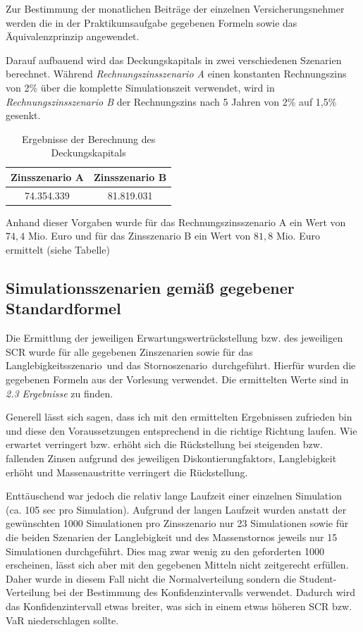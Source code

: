 \documentclass[parskip,12pt,paper=a4]{scrartcl}
\begin{document}
Zur Bestimmung der monatlichen Beiträge der einzelnen Versicherungsnehmer werden die in der Praktikumsaufgabe
gegebenen Formeln sowie das Äquivalenzprinzip angewendet.

Darauf aufbauend wird das Deckungskapitals in zwei verschiedenen Szenarien berechnet. Während {\itshape Rechnungszinsszenario A} einen konstanten Rechnungszins von 2\% über die komplette Simulationszeit verwendet, wird in {\itshape Rechnungszinsszenario B} der Rechnungszins nach 5 Jahren von 2\% auf 1,5\% gesenkt.

\begin{table}[h!]
  \centering
  \label{table1}
  \begin{tabular}{|c|c|}
	\hline
    	Zinsszenario A & Zinsszenario B\\
    	\hline
    	74.354.339 & 81.819.031 \\
	\hline
  \end{tabular}
\caption{Ergebnisse der Berechnung des Deckungskapitals}
\end{table}

Anhand dieser Vorgaben wurde für das Rechnungszinsszenario A ein Wert von $74,4$ Mio. Euro und für das Zinsszenario B ein Wert von $81,8$ Mio. Euro ermittelt (siehe Tabelle)

\subsection{Simulationsszenarien gemäß gegebener Standardformel}

Die Ermittlung der jeweiligen Erwartungswertrückstellung bzw. des jeweiligen SCR wurde für alle gegebenen Zinszenarien sowie für das \glqq Langlebigkeitsszenario\grqq \ und das \glqq Stornoszenario\grqq \ durchgeführt. Hierfür wurden die gegebenen Formeln aus der Vorlesung verwendet. Die ermittelten Werte sind in {\itshape 2.3 Ergebnisse} zu finden.

Generell lässt sich sagen, dass ich mit den ermittelten Ergebnissen zufrieden bin und diese den Voraussetzungen entsprechend in die \glqq richtige Richtung laufen\grqq . Wie erwartet verringert bzw. erhöht sich die Rückstellung bei steigenden bzw. fallenden Zinsen aufgrund des jeweiligen Diskontierungfaktors, Langlebigkeit erhöht und Massenaustritte verringert die Rückstellung. 

Enttäuschend war jedoch die relativ lange Laufzeit einer einzelnen Simulation (ca. 105 sec pro Simulation).
Aufgrund der langen Laufzeit wurden anstatt der gewünschten 1000 Simulationen pro Zinsszenario nur 23 Simulationen sowie für die beiden Szenarien der Langlebigkeit und des Massenstornos jeweils nur 15 Simulationen durchgeführt. Dies mag zwar wenig zu den geforderten 1000 erscheinen, lässt sich aber mit den gegebenen Mitteln nicht zeitgerecht erfüllen. Daher wurde in diesem Fall nicht die Normalverteilung sondern die Student-Verteilung bei der Bestimmung des Konfidenzintervalls verwendet. Dadurch wird das Konfidenzintervall etwas breiter, was sich in einem etwas höheren SCR bzw. VaR niederschlagen sollte.
\end{document}
